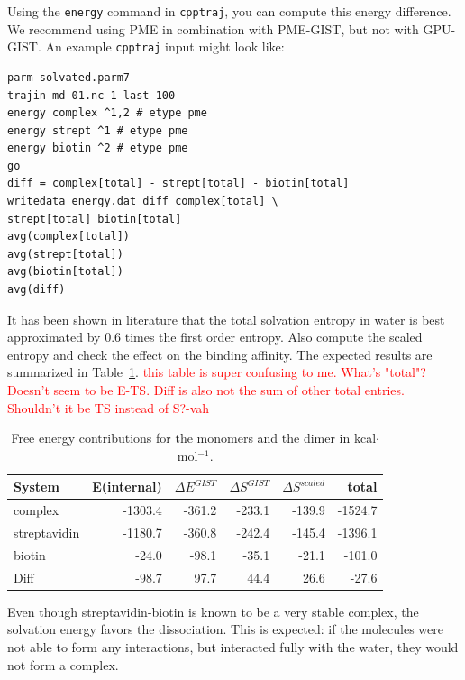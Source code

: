\documentclass[9pt,tutorial]{livecoms}
\newcommand{\software}{\texttt}
\newcommand{\todo}{\textcolor{red}}
\newcommand\inlinecode{\texttt}
\begin{document}
Using the \inlinecode{energy} command in \software{cpptraj}, you can compute this energy difference.
We recommend using PME in combination with PME-GIST, but not with GPU-GIST\@.
An example \software{cpptraj} input might look like:
\begin{lstlisting}
parm solvated.parm7
trajin md-01.nc 1 last 100
energy complex ^1,2 # etype pme
energy strept ^1 # etype pme
energy biotin ^2 # etype pme
go
diff = complex[total] - strept[total] - biotin[total]
writedata energy.dat diff complex[total] \
strept[total] biotin[total]
avg(complex[total])
avg(strept[total])
avg(biotin[total])
avg(diff)
\end{lstlisting}

It has been shown in literature \cite{Chen2021,Waibl2022-gist-solvents} that the total solvation entropy in water is best approximated by 0.6 times the first order entropy.
Also compute the scaled entropy and check the effect on the binding affinity.
The expected results are summarized in Table~\ref{tab_dg_monomers_dimer}.
\todo{this table is super confusing to me. What's "total"? Doesn't seem to be E-TS. Diff is also not the sum of other total entries. Shouldn't it be TS instead of S?-vah}
\begin{table}[h]
	\caption{Free energy contributions for the monomers and the dimer in kcal$\cdot$mol$^{-1}$.}\label{tab_dg_monomers_dimer}
	\small
	\begin{tabular}{lrrrrr}
		\toprule
		System       & E(internal) & $\Delta E^\textit{GIST}$ & $\Delta S^\textit{GIST}$ & $\Delta S^\textit{scaled}$ & total \\
		\midrule
		complex      & -1303.4 & -361.2 & -233.1 & -139.9 & -1524.7 \\
		streptavidin & -1180.7 & -360.8 & -242.4 & -145.4 & -1396.1 \\
		biotin       & -24.0   &  -98.1 &  -35.1 &  -21.1 &  -101.0 \\
		Diff         & -98.7   &   97.7 &   44.4 &   26.6 &   -27.6 \\
		\bottomrule
	\end{tabular}
\end{table}

Even though streptavidin-biotin is known to be a very stable complex, the solvation energy favors the dissociation.
This is expected: if the molecules were not able to form any interactions, but interacted fully with the water, they would not form a complex.
\end{document}
